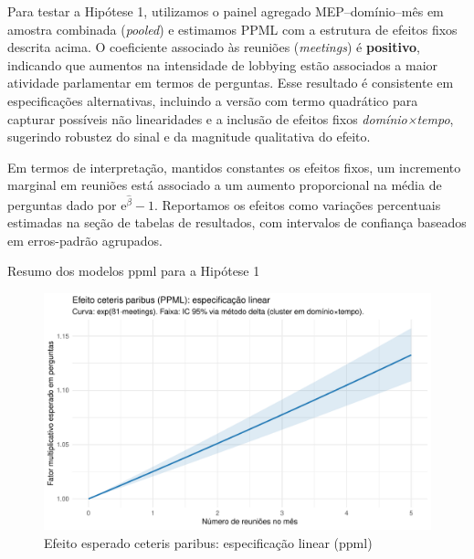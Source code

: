 Para testar a Hipótese 1, utilizamos o painel agregado MEP–domínio–mês em amostra combinada (\textit{pooled}) e estimamos PPML com a estrutura de efeitos fixos descrita acima. O coeficiente associado às reuniões (\textit{meetings}) é \textbf{positivo}, indicando que aumentos na intensidade de lobbying estão associados a maior atividade parlamentar em termos de perguntas. Esse resultado é consistente em especificações alternativas, incluindo a versão com termo quadrático para capturar possíveis não linearidades e a inclusão de efeitos fixos \textit{domínio×tempo}, sugerindo robustez do sinal e da magnitude qualitativa do efeito.

Em termos de interpretação, mantidos constantes os efeitos fixos, um incremento marginal em reuniões está associado a um aumento proporcional na média de perguntas dado por \(\mathrm{e}^{\hat{\beta}}-1\). Reportamos os efeitos como variações percentuais estimadas na seção de tabelas de resultados, com intervalos de confiança baseados em erros-padrão agrupados.

\begin{table}[htbp]
\centering
\caption{Resumo dos modelos \acrshort{ppml} para a Hipótese 1}
\label{tab:ppml_h1_both}

\end{table}

\begin{figure}[htbp]
\centering
\includegraphics[width=\textwidth]{figures/fig8_effect_linear_ppml.pdf}
\caption{Efeito esperado ceteris paribus: especificação linear (\acrshort{ppml})}
\label{fig:effect_linear_ppml}
\end{figure}

